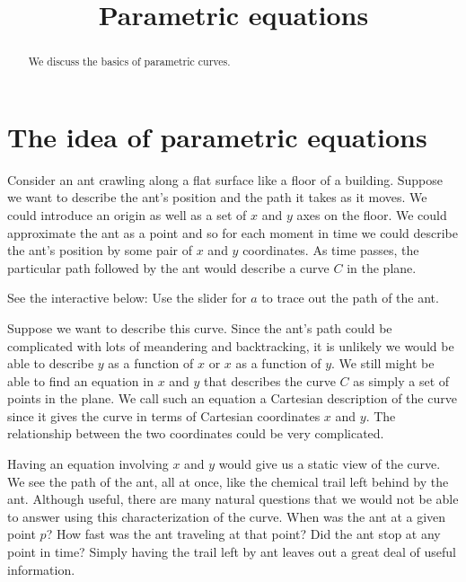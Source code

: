 \documentclass{ximera}
\title[Dig-In:]{Parametric equations}
\begin{document}
\begin{abstract}
  We discuss the basics of parametric curves.
\end{abstract}
\maketitle

\section{The idea of parametric equations}



 Consider an ant crawling along a flat surface like a floor of a building. Suppose we want to describe the ant's position and the path it takes as it moves. We could introduce an origin as well as a set of $x$ and $y$ axes on the floor. We could approximate the ant as a point and so for each moment in time we could describe the ant's position  by some pair of $x$ and $y$ coordinates. As time passes, the particular path followed by the ant would describe a curve $C$ in the plane.

\begin{onlineOnly}
See the interactive below: Use the slider for $a$ to trace out the path of the ant.

\end{onlineOnly}

Suppose we want to describe this curve. Since the ant's path could be complicated with lots of meandering and backtracking, it is unlikely we would be able to describe $y$ as a function of $x$ or $x$ as a function of $y$. We still might be able to find an equation in $x$ and $y$ that describes the curve $C$ as simply a set of points in the plane. We call such an equation a Cartesian description of the curve since it gives the curve in terms of Cartesian coordinates $x$ and $y$. The relationship between the two coordinates could be very complicated.

Having an equation involving $x$ and $y$ would give us a static view of the curve. We see the path of the ant, all at once, like the chemical trail left behind by the ant. Although useful, there are many natural questions that we would not be able to answer using this characterization of the curve. When was the ant at a given point $p$? How fast was the ant traveling at that point? Did the ant stop at any point in time? Simply having the trail left by ant leaves out a great deal of useful information.
\end{document}
